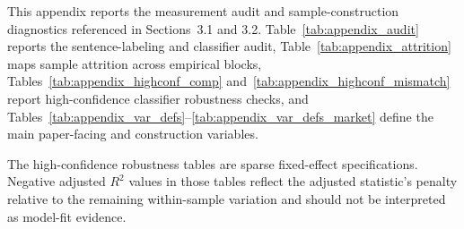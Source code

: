 This appendix reports the measurement audit and sample-construction diagnostics referenced in Sections~3.1 and 3.2. Table~\ref{tab:appendix_audit} reports the sentence-labeling and classifier audit, Table~\ref{tab:appendix_attrition} maps sample attrition across empirical blocks, Tables~\ref{tab:appendix_highconf_comp} and~\ref{tab:appendix_highconf_mismatch} report high-confidence classifier robustness checks, and Tables~\ref{tab:appendix_var_defs}--\ref{tab:appendix_var_defs_market} define the main paper-facing and construction variables.

The high-confidence robustness tables are sparse fixed-effect specifications. Negative adjusted $R^2$ values in those tables reflect the adjusted statistic's penalty relative to the remaining within-sample variation and should not be interpreted as model-fit evidence.










